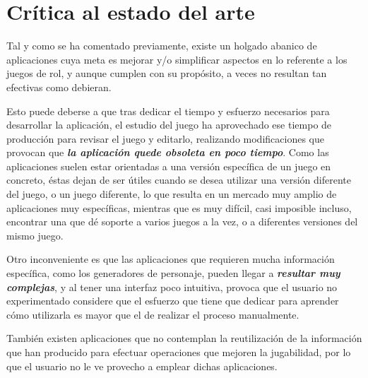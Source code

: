 

\section{Crítica al estado del arte} \label{Critica_Estado_Arte}
Tal y como se ha comentado previamente, existe un holgado abanico de 
aplicaciones cuya meta es mejorar y/o simplificar aspectos en lo referente a 
los juegos de rol, y aunque cumplen con su propósito, a veces no resultan 
tan efectivas como debieran. 
\medskip 

Esto puede deberse a que tras dedicar el tiempo y esfuerzo necesarios para 
desarrollar la aplicación, el estudio del juego ha aprovechado ese tiempo 
de producción para revisar el juego y editarlo, realizando modificaciones 
que provocan que \emph{\textbf{la aplicación quede obsoleta en poco tiempo}}. 
Como las aplicaciones suelen estar orientadas a una versión específica de un juego en concreto, 
éstas dejan de ser útiles cuando se desea utilizar una versión diferente del juego, o un juego 
diferente, lo que resulta en un mercado muy amplio de aplicaciones muy específicas, mientras que 
es muy difícil, casi imposible incluso, encontrar una que dé soporte a varios juegos a la vez, 
o a diferentes versiones del mismo juego. \medskip

Otro inconveniente es que las aplicaciones que requieren mucha información 
específica, como los generadores de personaje, pueden llegar a 
\emph{\textbf{resultar muy complejas}}, y al tener una interfaz poco intuitiva, 
provoca que el usuario no experimentado considere que el esfuerzo que tiene que 
dedicar para aprender cómo utilizarla es mayor que el de realizar el proceso manualmente. \medskip

También existen aplicaciones que no contemplan la reutilización de la 
información que han producido para efectuar operaciones que mejoren 
la jugabilidad, por lo que el usuario no le ve provecho a emplear dichas
aplicaciones.
